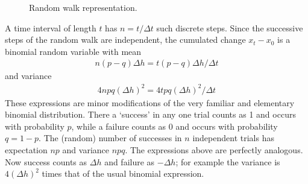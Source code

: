 \documentclass[\topdir/lecture\_notes.tex]{subfiles}
\begin{document}
\begin{figure}
    \caption{Random walk representation.}\label{fig:random_walk}
\end{figure}

A time interval of length \(t\) has \(n=t / \Delta t\) such discrete steps. Since the successive steps of the random walk are independent, the cumulated change \(x_{t}-x_{0}\) is a binomial random variable with mean
\begin{align*}
n(p-q) \Delta h=t(p-q) \Delta h / \Delta t
\end{align*}
and variance
\begin{align*}
4 n p q(\Delta h)^{2}=4 t p q(\Delta h)^{2} / \Delta t
\end{align*}
These expressions are minor modifications of the very familiar and elementary binomial distribution. There a `success' in any one trial counts as 1 and occurs with probability \(p\), while a failure counts as 0 and occurs with probability \(q=1-p\). The (random) number of successes in \(n\) independent trials has expectation \(n p\) and variance \(n p q\). The expressions above are perfectly analogous. Now success counts as \(\Delta h\) and failure as \(-\Delta h\); for example the variance is \(4(\Delta h)^{2}\) times that of the usual binomial expression.
\end{document}
